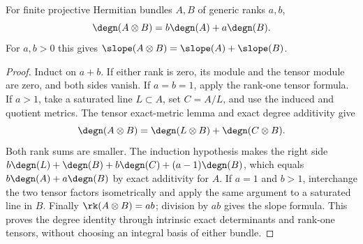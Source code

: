 \begin{lemma}
\label{lem:tensor-degree}
\leanok
For finite projective Hermitian bundles $A,B$ of generic ranks $a,b$,
\[
 \degn(A\otimes B)=b\degn(A)+a\degn(B).
\]
For $a,b>0$ this gives $\slope(A\otimes B)=\slope(A)+\slope(B)$.
\end{lemma}
\begin{proof}
Induct on $a+b$. If either rank is zero, its module and the tensor module
are zero, and both sides vanish. If $a=b=1$, apply the rank-one tensor
formula. If $a>1$, take a saturated line $L\subset A$, set $C=A/L$, and
use the induced and quotient metrics. The tensor exact-metric lemma and
exact degree additivity give
\[
 \degn(A\otimes B)=\degn(L\otimes B)+\degn(C\otimes B).
\]
Both rank sums are smaller. The induction hypothesis makes the right side
$b\degn(L)+\degn(B)+b\degn(C)+(a-1)\degn(B)$, which equals
$b\degn(A)+a\degn(B)$ by exact additivity for $A$. If $a=1$ and $b>1$,
interchange the two tensor factors isometrically and apply the same
argument to a saturated line in $B$.
Finally $\rk(A\otimes B)=ab$; division by $ab$ gives the slope formula.
This proves the degree identity through intrinsic exact determinants and
rank-one tensors, without choosing an integral basis of either bundle.
\end{proof}

